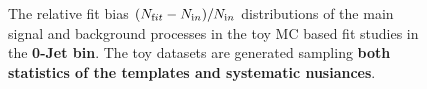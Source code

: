 \begin{figure}[!hbtp]
{} 

\caption{The relative fit bias $(N_{\text fit} - N_{\text in})/N_{\text in}$ distributions 
of the main signal and background processes in the toy MC based fit studies in the {\bf 0-Jet bin}. 
The toy datasets are generated sampling {\bf both statistics of the templates and systematic nusiances}. }
\label{fig:toyfit_0j}
\end{figure}
